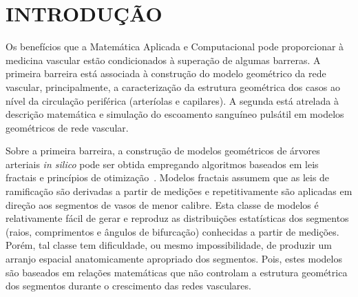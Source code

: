 \documentclass[
        english,			
        brazil			        %
        ,<...>]{abntbibufjf}
\begin{document}
\textual


\chapter{INTRODU\c{C}\~AO}  %

Os benefícios que a Matemática Aplicada e Computacional pode proporcionar à medicina vascular estão condicionados à superação de algumas barreras. A primeira barreira está associada à construção do modelo geométrico da rede vascular, principalmente, a caracterização da estrutura geométrica dos casos ao nível da circulação periférica (arteríolas e capilares). A segunda está atrelada à descrição matemática e simulação do escoamento sanguíneo pulsátil em modelos geométricos de rede vascular.


 Sobre a primeira barreira, a construção de modelos geométricos de árvores arteriais \textit{in silico} pode ser obtida empregando algoritmos baseados em leis fractais \cite{Dawant1986,VanBeek1989} e princípios de otimização~\cite{Karch1999,Queiroz2013,Schreiner1993}. Modelos fractais assumem que as leis de ramificação são derivadas a partir de medições e repetitivamente são aplicadas em direção aos segmentos de vasos de menor calibre. Esta classe de modelos é relativamente fácil de gerar e reproduz as distribuições estatísticas dos segmentos (raios, comprimentos e ângulos de bifurcação) conhecidas a partir de medições. Porém, tal classe tem dificuldade, ou mesmo impossibilidade, de produzir um arranjo espacial anatomicamente apropriado dos segmentos. Pois, estes modelos são baseados em relações matemáticas que não controlam a estrutura geométrica dos segmentos durante o crescimento das redes vasculares. 
\end{document}
